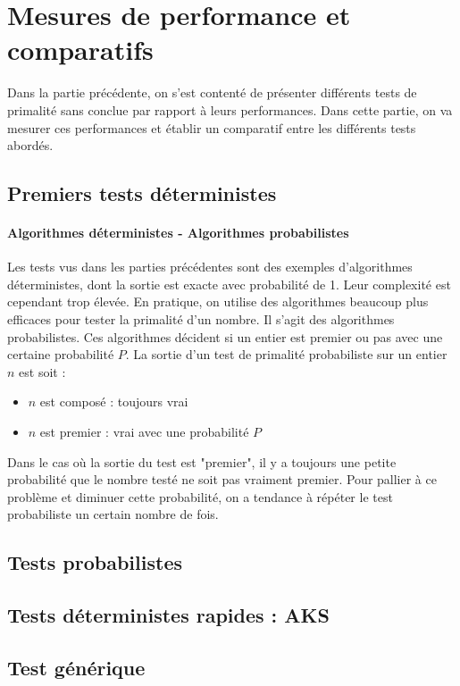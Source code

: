 \section{Mesures de performance et comparatifs}
	Dans la partie précédente, on s'est contenté de présenter différents tests de primalité sans conclue par rapport à leurs performances. Dans cette partie, on va mesurer ces performances et établir un comparatif entre les différents tests abordés.
	
	\subsection{Premiers tests déterministes}
		
		\paragraph{Algorithmes déterministes - Algorithmes probabilistes} Les tests vus dans les parties précédentes sont des exemples d'algorithmes déterministes, dont la sortie est exacte avec probabilité de 1. Leur complexité est cependant trop élevée. 
		En pratique, on utilise des algorithmes beaucoup plus efficaces pour tester la primalité d'un nombre. Il s'agit des algorithmes probabilistes. Ces algorithmes décident si un entier est premier ou pas avec une certaine probabilité $P$. La sortie d'un test de primalité probabiliste sur un entier $n$ est soit :
		\begin{itemize}
			\item $n$ est composé : toujours vrai
			\item $n$ est premier : vrai avec une probabilité $P$
		\end{itemize}
		Dans le cas où la sortie du test est "premier", il y a toujours une petite probabilité que le nombre testé ne soit pas vraiment premier. Pour pallier à ce problème et diminuer cette probabilité, on a tendance à répéter le test probabiliste un certain nombre de fois.
		
	\subsection{Tests probabilistes}
	\subsection{Tests déterministes rapides : AKS}
	\subsection{Test générique}
	
